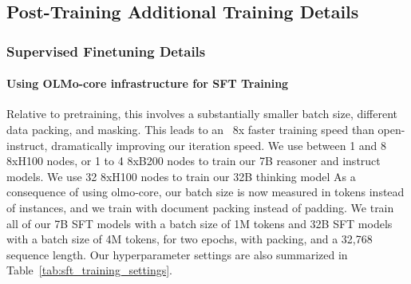 \documentclass[table]{ai2style/ai2}
\newcommand{\newOlmo}{Olmo\xspace}
\newcommand{\olmothreeinstruct}{\textsc{\newOlmo~3 Instruct}\xspace}
\newcommand{\olmothreethinking}{\textsc{Olmo~3 Think}\xspace}
\begin{document}
{{\subsection{Post-Training Additional Training Details}
\subsubsection{Supervised Finetuning Details}
\label{appx:sft-details}

\paragraph{Using OLMo-core infrastructure for SFT Training}
Relative to pretraining, this involves a substantially smaller batch size, different data packing, and masking.
This leads to an ~8x faster training speed than open-instruct, dramatically improving our iteration speed.
We use between 1 and 8 8xH100 nodes, or 1 to 4 8xB200 nodes to train our 7B reasoner and instruct models. We use 32 8xH100 nodes to train our 32B thinking model
As a consequence of using olmo-core, our batch size is now measured in tokens instead of instances, and we train with document packing instead of padding.
We train all of our 7B SFT models with a batch size of 1M tokens and 32B SFT models with a batch size of 4M tokens, for two epochs, with packing, and a 32{,}768 sequence length.
Our hyperparameter settings are also summarized in Table~\ref{tab:sft_training_settings}.

\begin{table}[th]
    \centering
    \begin{small}
    \end{small}
    \caption{\textbf{Training hyperparameters for \olmothreethinking SFT and \olmothreeinstruct SFT.} GPU hours assume NVIDIA H100 accelerator.}
    \label{tab:sft_training_settings}
\end{table}

}}
\end{document}
